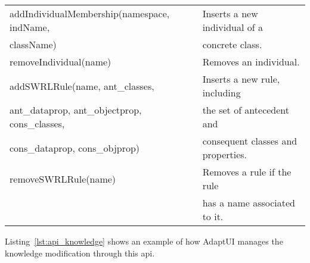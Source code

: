 \begin{center}
\begin{longtable}{l l}
  \hline 
  addIndividualMembership(namespace, indName,& Inserts a new individual of a \\
  className)				& concrete class.		\\
  removeIndividual(name)	 	& Removes an individual.	\\

  \hline 
  addSWRLRule(name, ant\_classes, 	& Inserts a new rule, including	\\
  ant\_dataprop, ant\_objectprop, cons\_classes,& the set of antecedent and\\
  cons\_dataprop, cons\_objprop)	& consequent classes and properties.\\
  removeSWRLRule(name)	 		& Removes a rule if the rule 	\\
					& has a name associated to it.	\\
  \hline
\end{longtable}
\end{center}

Listing~\ref{lst:api_knowledge} shows an example of how AdaptUI manages the
knowledge modification through this \ac{api}. 


\inputminted[linenos=true, fontsize=\footnotesize, frame=lines]{java}{4_system_architecture/api_knowledge.java}
